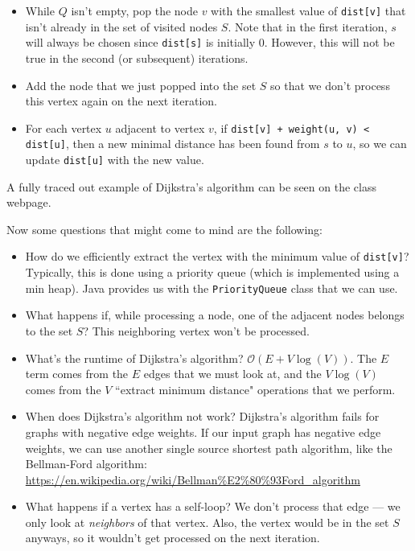 \begin{itemize}
    \item While $Q$ isn't empty, pop the node $v$ with the smallest value of \verb!dist[v]! that isn't already in the set of visited nodes $S$. Note that in the first iteration, $s$ will always be chosen since \verb!dist[s]! is initially $0$. However, this will not be true in the second (or subsequent) iterations.
    \item Add the node that we just popped into the set $S$ so that we don't process this vertex again on the next iteration.
    \item For each vertex $u$ adjacent to vertex $v$, if \verb!dist[v] + weight(u, v) < dist[u]!, then a new minimal distance has been found from $s$ to $u$, so we can update \verb!dist[u]! with the new value. 
\end{itemize}


A fully traced out example of Dijkstra's algorithm can be seen on the class webpage.

Now some questions that might come to mind are the following:

\begin{itemize}
    \item How do we efficiently extract the vertex with the minimum value of \verb!dist[v]!? Typically, this is done using a priority queue (which is implemented using a min heap). Java provides us with the \verb!PriorityQueue! class that we can use.
    \item What happens if, while processing a node, one of the adjacent nodes belongs to the set $S$? This neighboring vertex won't be processed.
    \item What's the runtime of Dijkstra's algorithm? $\mathcal{O}(E + V\log(V))$. The $E$ term comes from the $E$ edges that we must look at, and the $V\log(V)$ comes from the $V$ ``extract minimum distance" operations that we perform.
    \item When does Dijkstra's algorithm not work? Dijkstra's algorithm fails for graphs with negative edge weights. If our input graph has negative edge weights, we can use another single source shortest path algorithm, like the Bellman-Ford algorithm: \url{https://en.wikipedia.org/wiki/Bellman\%E2\%80\%93Ford_algorithm}
    \item What happens if a vertex has a self-loop? We don't process that edge --- we only look at \textit{neighbors} of that vertex. Also, the vertex would be in the set $S$ anyways, so it wouldn't get processed on the next iteration. 
\end{itemize}


